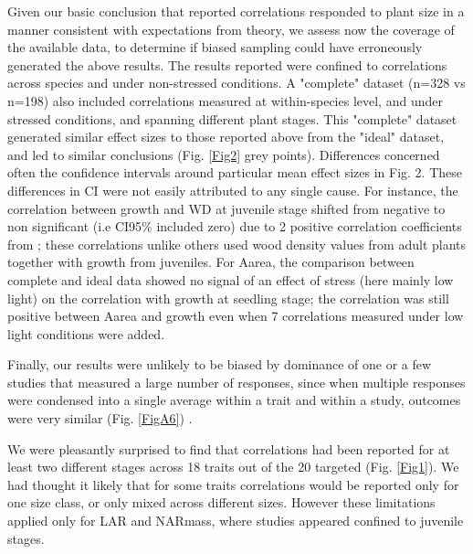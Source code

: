 \documentclass[a4paper]{article}\usepackage[]{graphicx}\usepackage[]{color}
\begin{document}
Given our basic conclusion that reported correlations responded to plant size in a manner consistent with expectations from theory, we assess now the coverage of the available data, to determine if biased sampling could have erroneously generated the above results. The results reported were confined to correlations across species and under non-stressed conditions. A "complete" dataset (n=328 vs n=198) also included correlations measured at within-species level, and under stressed conditions, and spanning different plant stages. This "complete" dataset generated similar effect sizes to those reported above from the "ideal" dataset, and led to similar conclusions (Fig. \ref{Fig2} grey points). Differences concerned often the confidence intervals around particular mean effect sizes in Fig. 2. These differences in CI were not easily attributed to any single cause. For instance, the correlation between growth and WD at juvenile stage shifted from negative to non significant (i.e CI95\% included zero) due to 2 positive correlation coefficients from \citet{Augspurger:1984ct};  these correlations unlike others used wood density values from adult plants together with growth from juveniles. For Aarea, the comparison between complete and ideal data showed no signal of an effect of stress (here mainly low light) on the correlation with growth at seedling stage; the correlation was still positive between Aarea and growth even when 7 correlations measured under low light conditions were added.

Finally, our results were unlikely to be biased by dominance of one or a few studies that measured a large number of responses, since when multiple responses were condensed into a single average within a trait and within a study, outcomes were very similar (Fig. \ref{FigA6}) .


We were pleasantly surprised to find that correlations had been reported for at least two different stages across 18 traits out of the 20 targeted (Fig. \ref{Fig1}). We had thought it likely that for some traits correlations would be reported only for one size class, or only mixed across different sizes. However these limitations applied only for LAR and NARmass, where studies appeared confined to juvenile stages.
\end{document}
